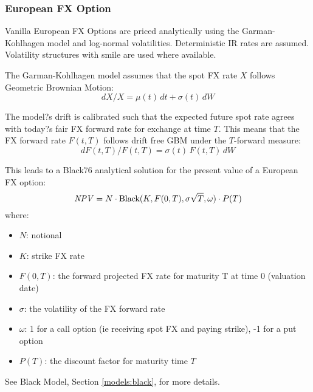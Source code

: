 \subsubsection{European FX Option}
\label{pricing:fx_option}

Vanilla European FX Options are priced analytically using the Garman-Kohlhagen 
model and log-normal volatilities.  Deterministic IR rates are assumed. Volatility 
structures with smile are used where available.

The Garman-Kohlhagen model assumes that the spot FX rate $X$ follows Geometric 
Brownian Motion:
$$
dX/X=\mu(t)\,dt+\sigma(t)\,dW
$$

The model?s drift is calibrated such that the expected future spot rate agrees 
with today?s fair FX forward rate for exchange at time $T$. This means that the 
FX forward rate $F(t,T)$ follows drift free GBM under the $T$-forward measure:
$$
dF(t,T)/F(t,T)=\sigma(t)\,F(t,T)\,dW
$$

This leads to a Black76 analytical solution for the present value of a European 
FX option:
$$
\mathit{NPV} = N\cdot \mbox{Black}(K,F(0,T),\sigma\sqrt{T},\omega)\cdot P(T)
$$
where:
\begin{itemize}
\item $N$: notional
\item $K$: strike FX rate
\item $F(0,T)$: the forward projected FX rate for maturity T at time 0 (valuation date)
\item $\sigma$: the volatility of the FX forward rate
\item $\omega$: 1 for a call option (ie receiving spot FX and paying strike), -1 for a put option
\item $P(T)$: the discount factor for maturity time $T$
\end{itemize}

See Black Model, Section \ref{models:black}, for more details.
